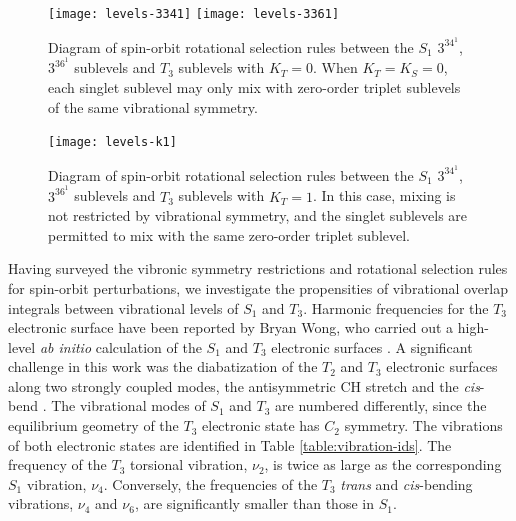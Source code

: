 \documentclass[12pt]{mitthesis}
\begin{document}
\begin{figure}
  \caption{Diagram of spin-orbit rotational selection rules between
    the $S_1$ $3^34^1$, $3^36^1$  sublevels and $T_3$ sublevels
    with $K_T=0$.  When $K_T=K_S=0$, each singlet sublevel may only
    mix with zero-order triplet sublevels of the same vibrational
    symmetry.}
  \label{fig:levels-k0}
  \centering
  \vspace{5mm}
  \texttt{[image: levels-3341]}
  \texttt{[image: levels-3361]}  
\end{figure}

\begin{figure}
  \caption{Diagram of spin-orbit rotational selection rules between
    the $S_1$ $3^34^1$, $3^36^1$  sublevels and $T_3$ sublevels
    with $K_T=1$.  In this case, mixing is not restricted by
    vibrational symmetry, and the singlet sublevels are permitted to
    mix with the same zero-order triplet sublevel.}
  \label{fig:levels-k1}
  \centering
  \vspace{5mm}
  \texttt{[image: levels-k1]}
\end{figure}


Having surveyed the vibronic symmetry restrictions and rotational
selection rules for spin-orbit perturbations, we investigate the
propensities of vibrational overlap integrals between vibrational
levels of $S_1$ and $T_3$.  Harmonic frequencies for the $T_3$
electronic surface have been reported by Bryan Wong, who carried out a
high-level \emph{ab initio} calculation of the $S_1$ and $T_3$
electronic surfaces \cite{wong07}.  A significant challenge in this
work was the diabatization of the $T_2$ and $T_3$ electronic surfaces
along two strongly coupled modes, the antisymmetric CH stretch and the
\emph{cis}-bend \cite{thom07}.  The vibrational modes of $S_1$ and
$T_3$ are numbered differently, since the equilibrium geometry of the
$T_3$ electronic state has $C_2$ symmetry.  The vibrations of both
electronic states are identified in Table \ref{table:vibration-ids}.
The frequency of the $T_3$ torsional vibration, $\nu_2$, is twice as
large as the corresponding $S_1$ vibration, $\nu_4$.  Conversely, the
frequencies of the $T_3$ \emph{trans} and \emph{cis}-bending
vibrations, $\nu_4$ and $\nu_6$, are significantly smaller than those
in $S_1$.
\end{document}
